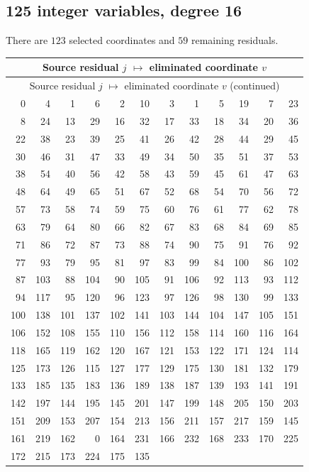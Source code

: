 \documentclass[11pt,letterpaper]{article}
\theoremstyle{definition}
\theoremstyle{remark}
\begin{document}
\subsection{125 integer variables, degree 16}
There are $123$ selected coordinates and $59$ remaining residuals.
\begingroup
\small
\setlength{\tabcolsep}{4pt}
\begin{longtable}{*{6}{r@{\,$\mapsto$\,}r}}
\hline
\multicolumn{12}{c}{Source residual $j$ $\mapsto$ eliminated coordinate $v$}\\
\hline
\endfirsthead
\hline
\multicolumn{12}{c}{Source residual $j$ $\mapsto$ eliminated coordinate $v$ (continued)}\\
\hline
\endhead
0 & 4 & 1 & 6 & 2 & 10 & 3 & 1 & 5 & 19 & 7 & 23 \\
8 & 24 & 13 & 29 & 16 & 32 & 17 & 33 & 18 & 34 & 20 & 36 \\
22 & 38 & 23 & 39 & 25 & 41 & 26 & 42 & 28 & 44 & 29 & 45 \\
30 & 46 & 31 & 47 & 33 & 49 & 34 & 50 & 35 & 51 & 37 & 53 \\
38 & 54 & 40 & 56 & 42 & 58 & 43 & 59 & 45 & 61 & 47 & 63 \\
48 & 64 & 49 & 65 & 51 & 67 & 52 & 68 & 54 & 70 & 56 & 72 \\
57 & 73 & 58 & 74 & 59 & 75 & 60 & 76 & 61 & 77 & 62 & 78 \\
63 & 79 & 64 & 80 & 66 & 82 & 67 & 83 & 68 & 84 & 69 & 85 \\
71 & 86 & 72 & 87 & 73 & 88 & 74 & 90 & 75 & 91 & 76 & 92 \\
77 & 93 & 79 & 95 & 81 & 97 & 83 & 99 & 84 & 100 & 86 & 102 \\
87 & 103 & 88 & 104 & 90 & 105 & 91 & 106 & 92 & 113 & 93 & 112 \\
94 & 117 & 95 & 120 & 96 & 123 & 97 & 126 & 98 & 130 & 99 & 133 \\
100 & 138 & 101 & 137 & 102 & 141 & 103 & 144 & 104 & 147 & 105 & 151 \\
106 & 152 & 108 & 155 & 110 & 156 & 112 & 158 & 114 & 160 & 116 & 164 \\
118 & 165 & 119 & 162 & 120 & 167 & 121 & 153 & 122 & 171 & 124 & 114 \\
125 & 173 & 126 & 115 & 127 & 177 & 129 & 175 & 130 & 181 & 132 & 179 \\
133 & 185 & 135 & 183 & 136 & 189 & 138 & 187 & 139 & 193 & 141 & 191 \\
142 & 197 & 144 & 195 & 145 & 201 & 147 & 199 & 148 & 205 & 150 & 203 \\
151 & 209 & 153 & 207 & 154 & 213 & 156 & 211 & 157 & 217 & 159 & 145 \\
161 & 219 & 162 & 0 & 164 & 231 & 166 & 232 & 168 & 233 & 170 & 225 \\
172 & 215 & 173 & 224 & 175 & 135 & \multicolumn{2}{c}{} & \multicolumn{2}{c}{} & \multicolumn{2}{c}{} \\
\hline
\end{longtable}
\endgroup
\end{document}

